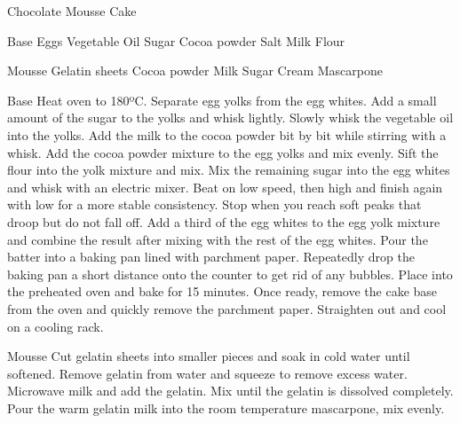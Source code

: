 \documentclass[10pt, a4paper]{article}
\begin{document}
	\begin{recipe}{Chocolate Mousse Cake}
		\begin{ingredients}[columns=2]
			\begin{ingredientgroup}{Base}
				 Eggs
				 Vegetable Oil
				 Sugar
				 Cocoa powder
				 Salt
				 Milk
				 Flour
			\end{ingredientgroup}
			\begin{ingredientgroup}{Mousse}
				 Gelatin sheets
				 Cocoa powder
				\ing{125g} Milk
				\ing{70g} Sugar
				\ing{175g} Cream
				 Mascarpone
			\end{ingredientgroup}
		\end{ingredients}
		\begin{procedure}
			\begin{proceduregroup}{Base}
				\step Heat oven to 180ºC.
				\step Separate egg yolks from the egg whites.
				\step Add a small amount of the sugar to the yolks and whisk lightly.
				\step Slowly whisk the vegetable oil into the yolks.
				\step Add the milk to the cocoa powder bit by bit while stirring with a whisk.
				\step Add the cocoa powder mixture to the egg yolks and mix evenly.
				\step Sift the flour into the yolk mixture and mix.
				\step Mix the remaining sugar into the egg whites and whisk with an electric mixer. Beat on low speed, then high and finish again with low for a more stable consistency. Stop when you reach soft peaks that droop but do not fall off.
				\step Add a third of the egg whites to the egg yolk mixture and combine the result after mixing with the rest of the egg whites.
				\step Pour the batter into a baking pan lined with parchment paper. Repeatedly drop the baking pan a short distance onto the counter to get rid of any bubbles.
				\step Place into the preheated oven and bake for 15 minutes.
				\step Once ready, remove the cake base from the oven and quickly remove the parchment paper. Straighten out and cool on a cooling rack.
			\end{proceduregroup}
			\begin{proceduregroup}{Mousse}
				\step Cut gelatin sheets into smaller pieces and soak in cold water until softened.
				\step Remove gelatin from water and squeeze to remove excess water.
				\step Microwave milk and add the gelatin. Mix until the gelatin is dissolved completely.
				\step Pour the warm gelatin milk into the room temperature mascarpone, mix evenly.

\end{proceduregroup}
\end{procedure}
\end{recipe}
\end{document}

